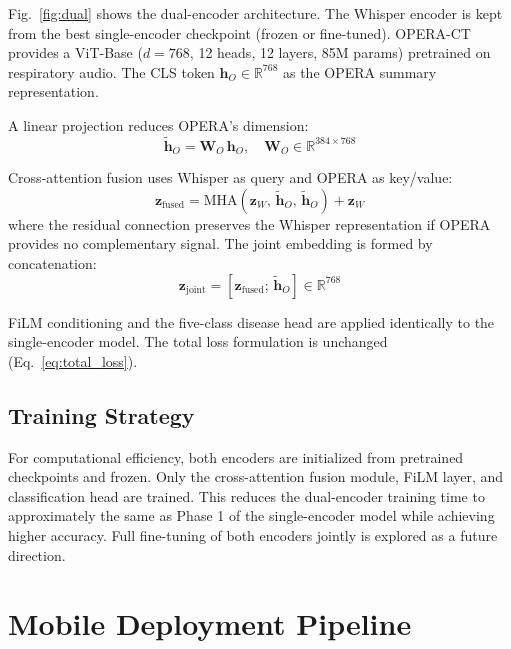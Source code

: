 \documentclass[10pt,journal,compsoc]{IEEEtran}
\begin{document}
Fig.~\ref{fig:dual} shows the dual-encoder architecture.
The Whisper encoder is kept from the best single-encoder checkpoint
(frozen or fine-tuned). OPERA-CT~\cite{opera} provides a ViT-Base
($d=768$, 12 heads, 12 layers, 85M params) pretrained on respiratory audio.
The CLS token $\mathbf{h}_O \in \mathbb{R}^{768}$ as the
OPERA summary representation.

A linear projection reduces OPERA's dimension:
\begin{equation}
\tilde{\mathbf{h}}_O = \mathbf{W}_O\,\mathbf{h}_O,\quad
\mathbf{W}_O \in \mathbb{R}^{384 \times 768}
\label{eq:opera_proj}
\end{equation}

Cross-attention fusion uses Whisper as query and OPERA as key/value:
\begin{equation}
\mathbf{z}_\mathrm{fused} = \mathrm{MHA}\!\left(
  \mathbf{z}_W,\, \tilde{\mathbf{h}}_O,\, \tilde{\mathbf{h}}_O
\right) + \mathbf{z}_W
\label{eq:xattn}
\end{equation}
where the residual connection preserves the Whisper representation
if OPERA provides no complementary signal.
The joint embedding is formed by concatenation:
\begin{equation}
\mathbf{z}_\mathrm{joint} = \left[\mathbf{z}_\mathrm{fused};\,
\tilde{\mathbf{h}}_O\right] \in \mathbb{R}^{768}
\label{eq:concat}
\end{equation}

FiLM conditioning and the five-class disease head are applied identically
to the single-encoder model. The total loss formulation is unchanged
(Eq.~\ref{eq:total_loss}).

\subsection{Training Strategy}

For computational efficiency, both encoders are initialized from
pretrained checkpoints and frozen. Only the cross-attention fusion
module, FiLM layer, and classification head are trained.
This reduces the dual-encoder training time to approximately the same
as Phase 1 of the single-encoder model while achieving higher accuracy.
Full fine-tuning of both encoders jointly is explored as a future direction.

\section{Mobile Deployment Pipeline}
\label{sec:mobile}
\end{document}

